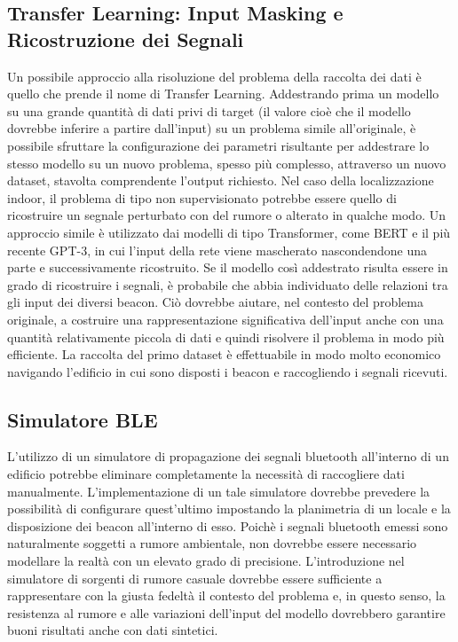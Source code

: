 \subsection{Transfer Learning: Input Masking e Ricostruzione dei Segnali}
Un possibile approccio alla risoluzione del problema della raccolta dei dati è
quello che prende il nome di Transfer Learning. Addestrando prima un modello su
una grande quantità di dati privi di target (il valore cioè che il modello
dovrebbe inferire a partire dall'input) su un problema simile all'originale, è
possibile sfruttare la configurazione dei parametri risultante per addestrare
lo stesso modello su un nuovo problema, spesso più complesso, attraverso un
nuovo dataset, stavolta comprendente l'output richiesto. Nel caso della
localizzazione indoor, il problema di tipo non supervisionato potrebbe essere
quello di ricostruire un segnale perturbato con del rumore o alterato in
qualche modo. Un approccio simile è utilizzato dai modelli di tipo
Transformer\cite{attention}, come BERT\cite{bert} e il più recente
GPT-3\cite{gpt3}, in cui l'input della rete viene mascherato nascondendone una
parte e successivamente ricostruito. Se il modello così addestrato risulta
essere in grado di ricostruire i segnali, è probabile che abbia individuato
delle relazioni tra gli input dei diversi beacon. Ciò dovrebbe aiutare, nel
contesto del problema originale, a costruire una rappresentazione significativa
dell'input anche con una quantità relativamente piccola di dati e quindi
risolvere il problema in modo più efficiente. La raccolta del primo dataset è
effettuabile in modo molto economico navigando l'edificio in cui sono disposti
i beacon e raccogliendo i segnali ricevuti.
\subsection{Simulatore BLE}
L'utilizzo di un simulatore di propagazione dei segnali bluetooth all'interno
di un edificio potrebbe eliminare completamente la necessità di raccogliere
dati manualmente. L'implementazione di un tale simulatore dovrebbe prevedere
la possibilità di configurare quest'ultimo impostando la planimetria di un
locale e la disposizione dei beacon all'interno di esso. Poichè i segnali
bluetooth emessi sono naturalmente soggetti a rumore ambientale, non dovrebbe
essere necessario modellare la realtà con un elevato grado di precisione.
L'introduzione nel simulatore di sorgenti di rumore casuale dovrebbe essere
sufficiente a rappresentare con la giusta fedeltà il contesto del problema e,
in questo senso, la resistenza al rumore e alle variazioni dell'input del
modello dovrebbero garantire buoni risultati anche con dati sintetici.
